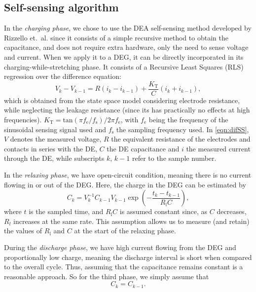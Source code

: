 \subsection{Self-sensing algorithm}
In the \emph{charging phase}, we chose to use the DEA self-sensing method developed by Rizzello et.\ al.\cite{RizzelloSS_improv} since it consists of a simple recursive method to obtain the capacitance, and does not require extra hardware, only the need to sense voltage and current. 
When we apply it to a DEG, it can be directly incorporated in its charging-while-stretching phase. It consists of a Recursive Least Squares (RLS) regression over the difference equation:
\begin{equation} \label{eqn:difSS}
V_k - V_{k-1} = R(i_k-i_{k-1})+\frac{K_\text{T}}{C}(i_k+i_{k-1}),
\end{equation}
which is obtained from the state space model considering electrode resistance, while neglecting the leakage resistance (since its has practically no effects at high frequencies). $K_\text{T} = \text{tan}(\pi f_\text{e}/f_\text{s})/2\pi f_\text{e}$, with $f_\text{e}$ being the frequency of the sinusoidal sensing signal used and $f_\text{s}$ the sampling frequency used. In \cref{eqn:difSS}, $V$ denotes the measured voltage, $R$ the equivalent resistance of the electrodes and contacts in series with the DE, $C$ the DE capacitance and $i$ the measured current through the DE, while subscripts $k$,  $k-1$ refer to the sample number. 

In the \emph{relaxing phase}, we have open-circuit condition, meaning there is no current flowing in or out of the DEG. Here, the charge in the DEG can be estimated by
\begin{equation}\label{eqn:ph2}
C_k = V_k^{-1}C_{k-1}V_{k-1}\exp\left(-\frac{t_k - t_{k-1}}{R_\text{l}C}\right),
\end{equation}
where $t$ is the sampled time, and $R_\text{l}C$ is assumed constant since, as $C$ decreases, $R_l$ increases at the same rate\cite{RN686}. This assumption allows us to measure (and retain) the values of $R_\text{l}$ and $C$ at the start of the relaxing phase.

During the \emph{discharge phase}, we have high current flowing from the DEG and proportionally low charge, meaning the discharge interval is short when compared to the overall cycle. Thus, assuming that the capacitance remains constant is a reasonable approach. So for the third phase, we simply assume that
\begin{equation}\label{eqn:ph3}
C_{k}=C_{k-1}.
\end{equation}

